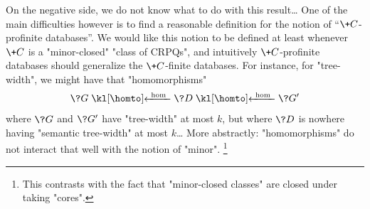 On the negative side, we do not know what to do with this result…
One of the main difficulties however is to find a reasonable definition for the notion of
``$\+C$-profinite databases''. We would like this notion to be defined at least whenever $\+C$ is a "minor-closed" "class of CRPQs", and intuitively $\+C$-profinite databases should
generalize the $\+C$-finite databases.
For instance, for "tree-width", we might have that "homomorphisms"
\[
	\?G \cohomto \?D \cohomto \?G'
\]
where $\?G$ and $\?G'$ have "tree-width" at most $k$,
but where $\?D$ is nowhere having "semantic tree-width" at most $k$…
More abstractly: "homomorphisms" do not interact that well with the notion of "minor".%
\footnote{This contrasts with the fact that "minor-closed classes" are closed under taking "cores".}

\clearpage
\begin{subappendices}
	
\end{subappendices}